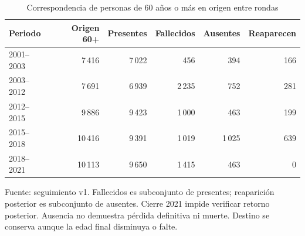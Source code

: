 \begin{table}[!htbp]
\centering
\caption{Correspondencia de personas de 60 años o más en origen entre rondas}\label{tab:exploracion-correspondencias}
\small\setlength{\tabcolsep}{4pt}
\renewcommand{\arraystretch}{1.15}
\begin{tabular}{lrrrrr}
\toprule
\textbf{Periodo} & \textbf{Origen 60+} & \textbf{Presentes} & \textbf{Fallecidos} & \textbf{Ausentes} & \textbf{Reaparecen} \\
\midrule
2001--2003 & 7\,416 & 7\,022 & 456 & 394 & 166 \\
2003--2012 & 7\,691 & 6\,939 & 2\,235 & 752 & 281 \\
2012--2015 & 9\,886 & 9\,423 & 1\,000 & 463 & 199 \\
2015--2018 & 10\,416 & 9\,391 & 1\,019 & 1\,025 & 639 \\
2018--2021 & 10\,113 & 9\,650 & 1\,415 & 463 & 0 \\
\bottomrule
\end{tabular}
\par\medskip
\parbox{\linewidth}{\footnotesize Fuente: seguimiento v1. Fallecidos es subconjunto de presentes; reaparición posterior es subconjunto de ausentes. Cierre 2021 impide verificar retorno posterior. Ausencia no demuestra pérdida definitiva ni muerte. Destino se conserva aunque la edad final disminuya o falte.}
\end{table}
